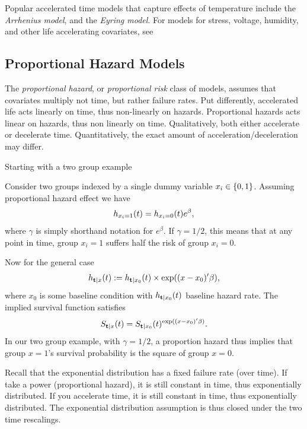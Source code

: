\begin{extra}
Popular accelerated time models that capture effects of temperature include the \emph{Arrhenius model}, and the \emph{Eyring model}.
For models for stress, voltage, humidity, and other life accelerating covariates, see \cite[Sec.8.1.5]{natrella_nist/sematech_2010}
\end{extra}





\subsection{Proportional Hazard Models}
The \emph{proportional hazard}, or \emph{proportional risk} class of models, assumes that covariates multiply not time, but rather failure rates. 
Put differently, accelerated life acts linearly on time, thus non-linearly on hazards. Proportional hazards acts linear on hazards, thus non linearly on time. 
Qualitatively, both either accelerate or decelerate time. 
Quantitatively, the exact amount of acceleration/deceleration may differ. 

Starting with a two group example
\begin{example}
Consider two groups indexed by a single dummy variable $x_i \in \{ 0,1 \}$.
Assuming proportional hazard effect we have
$$
	h_{x_i=1} (t)=h_{x_i=0} (t) e^\beta, 
$$
where $\gamma$ is simply shorthand notation for $e^\beta$. 
If $\gamma=1/2$, this means that at any point in time, group $x_i=1$ suffers half the risk of group $x_i=0$.
\end{example}

Now for the general case
\begin{align}
\label{eq:proportional_hazard}
	h_{\mathbf{t}|x} (t):=h_{\mathbf{t}|x_0} (t) \times \exp((x-x_0)'\beta) ,
\end{align}
where $x_0$ is some baseline condition with $h_{\mathbf{t}|x_0} (t)$ baseline hazard rate.
The implied survival function satisfies 
$$ S_{\mathbf{t}|x} (t)=S_{\mathbf{t}|x_0} (t)^{\exp((x-x_0)'\beta)}.$$
In our two group example, with $\gamma=1/2$, a proportion hazard thus implies that group $x=1$'s survival probability is the square of group $x=0$. 






\begin{example}
Recall that the exponential distribution has a fixed failure rate (over time). 
If take a power (proportional hazard), it is still constant in time, thus exponentially distributed. 
If you accelerate time, it is still constant in time, thus exponentially distributed. 
The exponential distribution assumption is thus closed under the two time rescalings.
\end{example}

